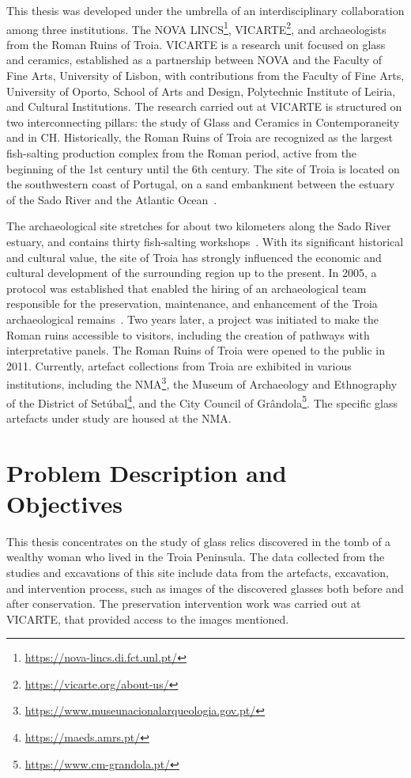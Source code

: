 This thesis was developed under the umbrella of an interdisciplinary collaboration among three institutions.
The NOVA LINCS\footnote{\url{https://nova-lincs.di.fct.unl.pt/}}, \gls{VICARTE}\footnote{\url{https://vicarte.org/about-us/}}, and archaeologists from the Roman Ruins of Troia.
\gls{VICARTE} is a research unit focused on glass and ceramics, established as a partnership between \gls{NOVA} and the Faculty of Fine Arts, University of Lisbon, with contributions from the Faculty of Fine Arts, University of Oporto, School of Arts and Design, Polytechnic Institute of Leiria, and Cultural Institutions.
The research carried out at \gls{VICARTE} is structured on two interconnecting pillars: the study of Glass and Ceramics in Contemporaneity and in \gls{CH}. 
Historically, the Roman Ruins of Troia are recognized as the largest fish-salting production complex from the Roman period, active from the beginning of the 1st century until the 6th century.
The site of Troia is located on the southwestern coast of Portugal, on a sand embankment between the estuary of the Sado River and the Atlantic Ocean~\cite{pinto2018reassessment}.

The archaeological site stretches for about two kilometers along the Sado River estuary, and contains thirty fish-salting workshops~\cite{hocquet2015fish}.
With its significant historical and cultural value, the site of Troia has strongly influenced the economic and cultural development of the surrounding region up to the present.
In 2005, a protocol was established that enabled the hiring of an archaeological team responsible for the preservation, maintenance, and enhancement of the Troia archaeological remains~\cite{pinto2014ruinas}. 
Two years later, a project was initiated to make the Roman ruins accessible to visitors, including the creation of pathways with interpretative panels. The Roman Ruins of Troia were opened to the public in 2011.
Currently, artefact collections from Troia are exhibited in various institutions, including the \gls{NMA}\footnote{\url{https://www.museunacionalarqueologia.gov.pt/}}, the Museum of Archaeology and Ethnography of the District of Setúbal\footnote{\url{https://maeds.amrs.pt/}}, and the City Council of Grândola\footnote{\url{https://www.cm-grandola.pt/}}. The specific glass artefacts under study are housed at the \gls{NMA}.


\section{Problem Description and Objectives}
\label{sec:problem_description} 
This thesis concentrates on the study of glass relics discovered in the tomb of a wealthy woman who lived in the Troia Peninsula. The data collected from the studies and excavations of this site include 
data from the artefacts, excavation, and intervention process, such as images of the discovered glasses both before and after conservation. 
The preservation intervention work was carried out at \gls{VICARTE}, that provided access to the images mentioned.

